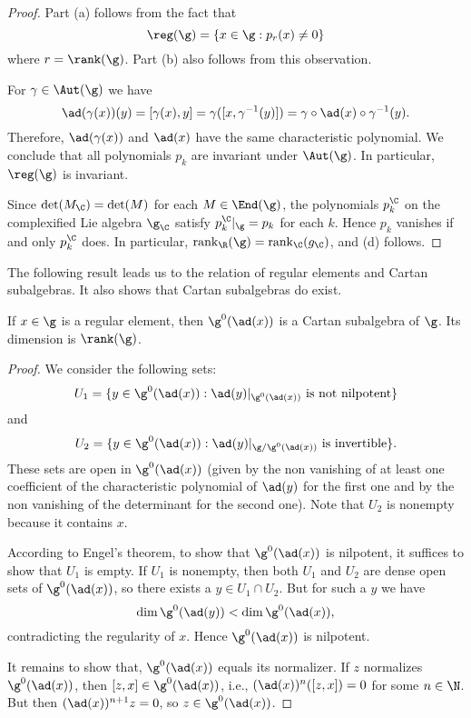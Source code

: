 \begin{proof}
Part (a) follows from the fact that
\[\reg(\g)=\{x\in\g:p_r(x)\neq 0\}\]
where $r=\rank(\g)$. Part (b) also follows from this observation.\par
For $\gamma\in\Aut(\g)$ we have
\[\ad(\gamma(x))(y)=[\gamma(x),y]=\gamma([x,\gamma^{-1}(y)])=\gamma\circ\ad(x)\circ\gamma^{-1}(y).\]
Therefore, $\ad(\gamma(x))$ and $\ad(x)$ have the same characteristic polynomial. We conclude that all polynomials $p_k$ are invariant under $\Aut(\g)$. In particular, $\reg(\g)$ is invariant.\par
Since $\det(M_{\C})=\det(M)$ for each $M\in\End(\g)$, the polynomials
$p_k^{\C}$ on the complexified Lie algebra $\g_{\C}$ satisfy $p_k^{\C}|_{\g}=p_k$ for each $k$. Hence $p_k$ vanishes if and only $p_k^{\C}$ does. In particular, $\mathrm{rank}_{\R}(\g)=\mathrm{rank}_{\C}(g_{\C})$, and (d) follows.
\end{proof}
The following result leads us to the relation of regular elements and Cartan subalgebras. It also shows that Cartan subalgebras do exist.
\begin{proposition}\label{Lie algebra regular element generate Cartan algebra}
If $x\in\g$ is a regular element, then $\g^0(\ad(x))$ is a Cartan subalgebra of $\g$. Its dimension is $\rank(\g)$.
\end{proposition}
\begin{proof}
We consider the following sets:
\[U_1=\{y\in\g^0(\ad(x)):\ad(y)|_{\g^0(\ad(x))}\text{ is not nilpotent}\}\]and
\[U_2=\{y\in\g^0(\ad(x)):\ad(y)|_{\g/\g^0(\ad(x))}\text{ is invertible}\}.\]
These sets are open in $\g^0(\ad(x))$ (given by the non vanishing of at least one coefficient of the characteristic polynomial of $\ad(y)$ for the first one and by the non vanishing of the determinant for the second one). Note that $U_2$ is nonempty because it contains $x$.\par
According to Engel's theorem, to show that $\g^0(\ad(x))$ is nilpotent, it suffices to show that $U_1$ is empty. If $U_1$ is nonempty, then both $U_1$ and $U_2$ are dense open sets of $\g^0(\ad(x))$, so there exists a $y\in U_1\cap U_2$. But for such a $y$ we have
\[\dim\g^0(\ad(y))<\dim\g^0(\ad(x)),\]
contradicting the regularity of $x$. Hence $\g^0(\ad(x))$ is nilpotent.\par
It remains to show that, $\g^0(\ad(x))$ equals its normalizer. If $z$ normalizes $\g^0(\ad(x))$, then $[z,x]\in\g^0(\ad(x))$, i.e., $(\ad(x))^n([z,x])=0$ for some $n\in\N$. But then $(\ad(x))^{n+1}z=0$, so $z\in\g^0(\ad(x))$.
\end{proof}
